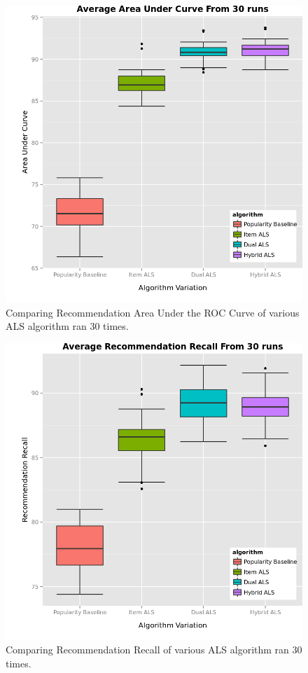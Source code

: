 \begin{figure}
\centering
\includegraphics[scale=0.7]{recent_images/auc.png}
\caption{Comparing Recommendation Area Under the ROC Curve of various ALS algorithm ran 30 times.}
\label{fig:algorithms}
\end{figure}

\begin{figure}
\centering
\includegraphics[scale=0.7]{recent_images/recall.png}
\caption{Comparing Recommendation Recall of various ALS algorithm ran 30 times.}
\label{fig:algorithms}
\end{figure}

